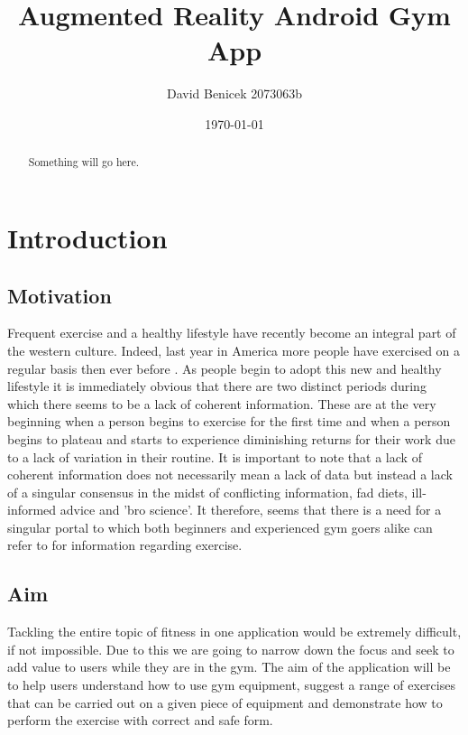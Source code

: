 \documentclass{l4proj}
\begin{document}
\title{Augmented Reality Android Gym App}
\author{David Benicek 2073063b}
\date{\today}
\maketitle

\begin{abstract}
Something will go here.
\end{abstract}

\educationalconsent
%
%
\tableofcontents

\chapter{Introduction}
\section{Motivation}
Frequent exercise and a healthy lifestyle have recently become an integral part of the western culture. Indeed, last year in America more people have exercised on a regular basis then ever before \cite{USexercise}. As people begin to adopt this new and healthy lifestyle it is immediately obvious that there are two distinct periods during which there seems to be a lack of coherent information. These are at the very beginning when a person begins to exercise for the first time and when a person begins to plateau and starts to experience diminishing returns for their work due to a lack of variation in their routine. It is important to note that a lack of coherent information does not necessarily mean a lack of data but instead a lack of a singular consensus in the midst of conflicting information, fad diets, ill-informed advice and 'bro science'. It therefore, seems that there is a need for a singular portal to which both beginners and experienced gym goers alike can refer to for information regarding exercise.  

\section{Aim} \label{sec:aim}
Tackling the entire topic of fitness in one application would be extremely difficult, if not impossible. Due to this we are going to narrow down the focus and seek to add value to users while they are in the gym. The aim of the application will be to help users understand how to use gym equipment, suggest a range of exercises that can be carried out on a given piece of equipment and demonstrate how to perform the exercise with correct and safe form. 
\end{document}
